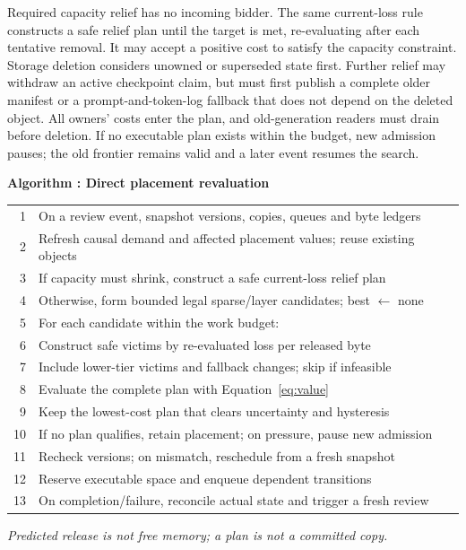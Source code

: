 Required capacity relief has no incoming bidder. The same current-loss
rule constructs a safe relief plan until the target is met, re-evaluating
after each tentative removal. It may accept a positive cost to satisfy
the capacity constraint. Storage deletion considers unowned or superseded
state first. Further relief may withdraw an active checkpoint claim,
but must first publish a complete older manifest or a prompt-and-token-log
fallback that does not depend on the deleted object. All owners' costs
enter the plan, and old-generation readers must drain before deletion.
If no executable plan exists within the budget, new admission pauses;
the old frontier remains valid and a later event resumes the search.

\par\medskip\noindent\begin{minipage}{\columnwidth}
\raggedright
 \label{alg:placement}
 \textbf{Algorithm \thedesignalgorithm: Direct placement revaluation}
 \par\smallskip
 \begin{tabularx}{\columnwidth}{@{}r@{\quad}X@{}}
 \toprule
 1 & On a review event, snapshot versions, copies, queues and byte ledgers \\
 2 & Refresh causal demand and affected placement values; reuse existing objects \\
 3 & If capacity must shrink, construct a safe current-loss relief plan \\
 4 & Otherwise, form bounded legal sparse/layer candidates; best $\leftarrow$ none \\
 5 & For each candidate within the work budget: \\
 6 & \quad Construct safe victims by re-evaluated loss per released byte \\
 7 & \quad Include lower-tier victims and fallback changes; skip if infeasible \\
 8 & \quad Evaluate the complete plan with Equation~\ref{eq:value} \\
 9 & \quad Keep the lowest-cost plan that clears uncertainty and hysteresis \\
 10 & If no plan qualifies, retain placement; on pressure, pause new admission \\
 11 & Recheck versions; on mismatch, reschedule from a fresh snapshot \\
 12 & Reserve executable space and enqueue dependent transitions \\
 13 & On completion/failure, reconcile actual state and trigger a fresh review \\
 \bottomrule
 \end{tabularx}
 \par\smallskip\noindent\textit{Predicted release is not free memory; a plan is not a committed copy.}
 \end{minipage}\par\medskip

